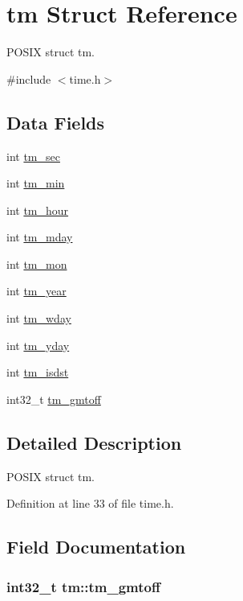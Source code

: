 \hypertarget{structtm}{\section{tm Struct Reference}
\label{structtm}
}


P\-O\-S\-I\-X struct tm.  




{\ttfamily \#include $<$time.\-h$>$}

\subsection*{Data Fields}
\begin{DoxyCompactItemize}
\item 
int \hyperlink{structtm_a4d098a9a5c03a00b2ee61e10851de81e}{tm\-\_\-sec}
\item 
int \hyperlink{structtm_af414eb7c86cc3099595211eee4d4211b}{tm\-\_\-min}
\item 
int \hyperlink{structtm_a3e7ca4e37f1abcaf56b8a916c38eb9fe}{tm\-\_\-hour}
\item 
int \hyperlink{structtm_ab8d8904bad43b0c8b96e61941c5b5310}{tm\-\_\-mday}
\item 
int \hyperlink{structtm_a112ac36fa2f593777138a417cf031e17}{tm\-\_\-mon}
\item 
int \hyperlink{structtm_a33adf78fd6476b2120ce3b9c4a852053}{tm\-\_\-year}
\item 
int \hyperlink{structtm_afe81a8c46f1c693c43f259b288859f4f}{tm\-\_\-wday}
\item 
int \hyperlink{structtm_a93a0ba77cc23796df84405dcbcc57eb1}{tm\-\_\-yday}
\item 
int \hyperlink{structtm_a5645ca0580c8ab2c24f6c2965d9c9f9c}{tm\-\_\-isdst}
\item 
int32\-\_\-t \hyperlink{structtm_a6b7d1fb16f21197ea027e364e2812c3d}{tm\-\_\-gmtoff}
\end{DoxyCompactItemize}


\subsection{Detailed Description}
P\-O\-S\-I\-X struct tm. 

Definition at line 33 of file time.\-h.



\subsection{Field Documentation}
\hypertarget{structtm_a6b7d1fb16f21197ea027e364e2812c3d}{
\subsubsection[{tm\-\_\-gmtoff}]{\setlength{\rightskip}{0pt plus 5cm}int32\-\_\-t tm\-::tm\-\_\-gmtoff}}\label{structtm_a6b7d1fb16f21197ea027e364e2812c3d}


